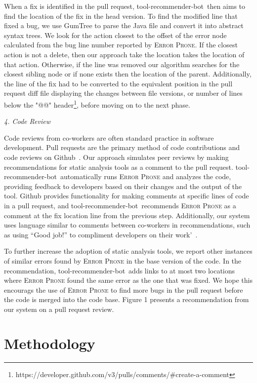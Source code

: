 \documentclass[conference]{IEEEtran}
\newcommand{\tool}{tool-recommender-bot}
\newcommand{\pseudosubsection}[1]{\vspace{2mm} {\it #1}}
\begin{document}
When a fix is identified in the pull request, \tool~then aims to find the location of the fix in the head version. To find the modified line that fixed a bug, we use GumTree to parse the Java file and convert it into abstract syntax trees. We look for the action closest to the offset of the error node calculated from the bug line number reported by \textsc{Error Prone}. If the closest action is not a delete, then our approach take the location takes the location of that action. Otherwise, if the line was removed our algorithm searches for the closest sibling node or if none exists then the location of the parent. Additionally, the line of the fix had to be converted to the equivalent position in the pull request diff file displaying the changes between file versions, or number of lines below the "@@" header\footnote{https://developer.github.com/v3/pulls/comments/\#create-a-comment}, before moving on to the next phase.

\pseudosubsection{4. Code Review}

Code reviews from co-workers are often standard practice in software development. Pull requests are the primary method of code contributions and code reviews on Github~\cite{PullRequestReview}. Our approach simulates peer reviews by making recommendations for static analysis tools as a comment to the pull request. \tool~automatically runs \textsc{Error Prone} and analyzes the code, providing feedback to developers based on their changes and the output of the tool. Github provides functionality for making comments at specific lines of code in a pull request, and \tool~recommends \textsc{Error Prone} as a comment at the fix location line from the previous step. Additionally, our system  uses language similar to comments between co-workers in recommendations, such as using ``Good job!'' to compliment developers on their work'~\cite{?}.

To further increase the adoption of static analysis tools, we report other instances of similar errors found by \textsc{Error Prone} in the base version of the code. In the recommendation, \tool~adds links to at most two locations where \textsc{Error Prone} found the same error as the one that was fixed. We hope this encourags the use of \textsc{Error Prone} to find more bugs in the pull request before the code is merged into the code base. Figure 1 presents a recommendation from our system on a pull request review.

\section{Methodology}
\end{document}
